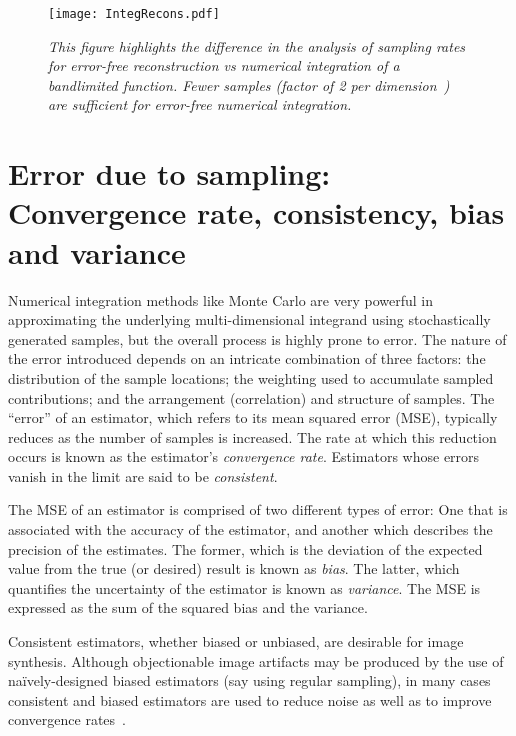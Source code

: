 \documentclass[11pt,fleqn]{book} %
\newcommand{\TBC} {}
\begin{document}
\TBC
\begin{figure}
 \centering
 {
  \texttt{[image: IntegRecons.pdf]}
 }
 \caption{\emph{This figure highlights the difference in the analysis of sampling rates for error-free reconstruction vs numerical integration of a bandlimited function. Fewer samples (factor of 2 per dimension~\cite{Cov5D}) are sufficient for error-free numerical integration.}}
\end{figure}

\section{Error due to sampling: Convergence rate, consistency, bias and variance} 
Numerical integration methods like Monte Carlo are very powerful in approximating the underlying  multi-dimensional integrand using stochastically generated samples, but the overall process is highly prone to error. The nature of the error introduced depends on an intricate combination of three factors: the distribution of the sample locations; the weighting used to accumulate sampled contributions; and the arrangement (correlation) and structure of samples. The ``error'' of an estimator, which refers to its mean squared error (MSE), typically reduces as the number of samples is increased. The rate at which this reduction occurs is known as the estimator's \textit{convergence rate}. Estimators whose errors vanish in the limit are said to be \textit{consistent}.

The MSE of an estimator is comprised of two different types of error: One that is associated with the accuracy of the estimator, and another which describes the precision of the estimates. The former, which is the deviation of the expected value from the true (or desired) result is known as \textit{bias}. The latter, which quantifies the uncertainty of the estimator is known as \textit{variance}. The MSE is expressed as the sum of the squared bias and the variance.

Consistent estimators, whether biased or unbiased, are desirable for image synthesis. Although objectionable image artifacts may be produced by the use of na\"ively-designed biased estimators (say using regular sampling), in many cases consistent and biased estimators are used to reduce noise as well as to improve convergence rates~\cite{Keller:2012:AMCCourse}. 

\end{document}
